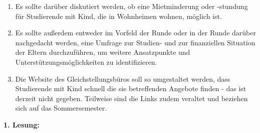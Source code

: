 {\begin{enumerate}
{            überschreitet). Der StuRa ist der Auffassung, dass Studierende mit Kind keineswegs in
            der
            Pflicht sein sollten, einen Härtefallantrag zu stellen. Vielmehr muss in der Runde
            diskutiert
            werden, ob die Uni Heidelberg die Fristen für alle Studierende mit Kind pauschal
            verlängern
            kann. Wenn das nicht möglich ist, soll die Uni Heidelberg sich mit den anderen
            Hochschulen
            in Baden-Württemberg zusammenschließen und gegenüber dem Wissenschaftsministerium
            eine solche Regelung fordern.}
            \item {Es sollte darüber diskutiert werden, ob eine Mietminderung oder -stundung für
            Studierende
            mit Kind, die in Wohnheimen wohnen, möglich ist.}
            \item {Es sollte außerdem entweder im Vorfeld der Runde oder in der Runde darüber
            nachgedacht
            werden, eine Umfrage zur Studien- und zur finanziellen Situation der Eltern
            durchzuführen,
            um weitere Ansatzpunkte und Unterstützungsmöglichkeiten zu identifizieren.}
            \item {Die Website des Gleichstellungsbüros soll so umgestaltet werden, dass Studierende
            mit
            Kind schnell die sie betreffenden Angebote finden - das ist derzeit nicht gegeben.
            Teilweise
            sind die Links zudem veraltet und beziehen sich auf das Sommersemester.}
        \end{enumerate}
    }{
    }{
        \textbf{1. Lesung:}
        \ul{
        }
    }{
    }
